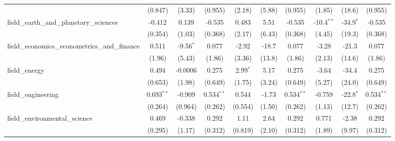 \begin{tabular}{lccccccccc}
                                                               & (0.847)        & (3.33)         & (0.955)        & (2.18)         & (5.88)        & (0.955)        & (1.85)         & (18.6)         & (0.955)\\   
   field\_earth\_and\_planetary\_sciences                      & -0.412         & 0.139          & -0.535         & 0.483          & 5.51          & -0.535         & -10.4$^{**}$   & -34.9$^{*}$    & -0.535\\   
                                                               & (0.354)        & (1.03)         & (0.368)        & (2.17)         & (6.43)        & (0.368)        & (4.45)         & (19.3)         & (0.368)\\   
   field\_economics\_econometrics\_and\_finance                & 0.511          & -9.56$^{*}$    & 0.077          & -2.92          & -18.7         & 0.077          & -3.28          & -21.3          & 0.077\\   
                                                               & (1.96)         & (5.43)         & (1.86)         & (3.36)         & (13.8)        & (1.86)         & (2.13)         & (14.6)         & (1.86)\\   
   field\_energy                                               & 0.494          & -0.0006        & 0.275          & 2.99$^{*}$     & 5.17          & 0.275          & -3.64          & -34.4          & 0.275\\   
                                                               & (0.653)        & (1.98)         & (0.649)        & (1.75)         & (3.24)        & (0.649)        & (5.27)         & (24.0)         & (0.649)\\   
   field\_engineering                                          & 0.693$^{**}$   & -0.909         & 0.534$^{**}$   & 0.544          & -1.73         & 0.534$^{**}$   & -0.759         & -22.8$^{*}$    & 0.534$^{**}$\\   
                                                               & (0.264)        & (0.964)        & (0.262)        & (0.554)        & (1.50)        & (0.262)        & (1.13)         & (12.7)         & (0.262)\\   
   field\_environmental\_science                               & 0.469          & -0.338         & 0.292          & 1.11           & 2.64          & 0.292          & 0.771          & -2.38          & 0.292\\   
                                                               & (0.295)        & (1.17)         & (0.312)        & (0.819)        & (2.10)        & (0.312)        & (1.89)         & (9.97)         & (0.312)\\   

\end{tabular}
